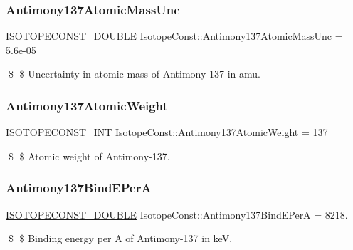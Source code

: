 \subsubsection{\texorpdfstring{Antimony137\+Atomic\+Mass\+Unc}{Antimony137AtomicMassUnc}}
{\footnotesize\ttfamily \mbox{\hyperlink{group___isotope_const-_macros_ga8f45a7272ce02c0b4c65c44636ed719a}{I\+S\+O\+T\+O\+P\+E\+C\+O\+N\+S\+T\+\_\+\+D\+O\+U\+B\+LE}} Isotope\+Const\+::\+Antimony137\+Atomic\+Mass\+Unc = 5.\+6e-\/05}

\$ \$ Uncertainty in atomic mass of Antimony-\/137 in amu. \mbox{\label{group___isotope_const-_antimony-_sb137_gaaf461b3821d74d3d45ab9b8b91702e16}} 
\subsubsection{\texorpdfstring{Antimony137\+Atomic\+Weight}{Antimony137AtomicWeight}}
{\footnotesize\ttfamily \mbox{\hyperlink{group___isotope_const-_macros_ga5f18360b3e99483a35c32d789e62621c}{I\+S\+O\+T\+O\+P\+E\+C\+O\+N\+S\+T\+\_\+\+I\+NT}} Isotope\+Const\+::\+Antimony137\+Atomic\+Weight = 137}

\$ \$ Atomic weight of Antimony-\/137. \mbox{\label{group___isotope_const-_antimony-_sb137_gae179ca537bf44f5d5e1e81b6eead8126}} 
\subsubsection{\texorpdfstring{Antimony137\+Bind\+E\+PerA}{Antimony137BindEPerA}}
{\footnotesize\ttfamily \mbox{\hyperlink{group___isotope_const-_macros_ga8f45a7272ce02c0b4c65c44636ed719a}{I\+S\+O\+T\+O\+P\+E\+C\+O\+N\+S\+T\+\_\+\+D\+O\+U\+B\+LE}} Isotope\+Const\+::\+Antimony137\+Bind\+E\+PerA = 8218.}

\$ \$ Binding energy per A of Antimony-\/137 in keV. \mbox{\label{group___isotope_const-_antimony-_sb137_ga7f1c1e49b0df74d08aa826697d6718d0}} 
